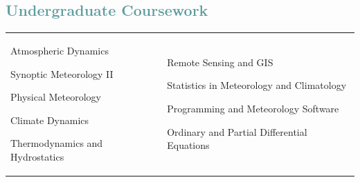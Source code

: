 \documentclass[margin,line,palatino,courier,10pt]{res}
\newenvironment{list1}{
  \begin{list}{\ding{113}}{%
      \setlength{\itemsep}{0in}
      \setlength{\parsep}{0in} \setlength{\parskip}{0in}
      \setlength{\topsep}{0in} \setlength{\partopsep}{0in}
      \setlength{\leftmargin}{0.17in}}}{\end{list}}
\begin{document}
\begin{resume}
\section{\sc \textcolor{CadetBlue}{\large{Undergraduate Coursework}}}
\vspace{-0.1in}
\begin{tabular}{@{}p{2.2in}p{3in}}
\vspace*{0.04in}
\begin{list1}
\item Atmospheric Dynamics
\item Synoptic Meteorology II
\item Physical Meteorology
\item Climate Dynamics
\item Thermodynamics and Hydrostatics 
\end{list1}
&
\begin{list1}
\item Remote Sensing and GIS
\item Statistics in Meteorology and Climatology
\item Programming and Meteorology Software
\item Ordinary and Partial Differential Equations
\end{list1}

\end{tabular}


\vspace{-0.1in}
\noindent\makebox[\linewidth][r]{\rule{\textwidth}{5pt}}
\vspace{-0.3in}


\end{resume}
\end{document}
